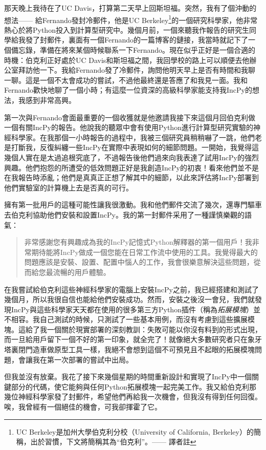 \documentclass[12pt,UTF8,nofonts]{book}
\begin{document}
那天晚上我待在了UC Davis，打算第二天早上回斯坦福。突然，我有了個沖動的想法—— 給Fernando發封冷郵件，他是UC Berkeley\footnote{UC Berkeley是加州大學伯克利分校（University of California, Berkeley）的簡稱，出於習慣，下文將簡稱其為“伯克利”。—— 譯者註}的一個研究科學家，他非常熱心於將Python投入到計算型研究中。幾個月前，一個來聽我作報告的研究生同學給我發了封郵件，裏面有一個Fernando的一篇博客的鏈接，我當時就記下了一個備忘錄，準備在將來某個時候聯系一下Fernando。現在似乎正好是一個合適的時機：伯克利正好處於UC Davis和斯坦福之間，我回學校的路上可以順便去他辦公室拜訪他一下。我給Fernando發了冷郵件，詢問他明天早上是否有時間和我聊一聊。這是一個不太會成功的嘗試，不過他最終還是答應了和我見一面。我和Fernando歡快地聊了一個小時；有這麼一位資深的高級科學家能支持我IncPy的想法，我感到非常高興。

第一次與Fernando會面最重要的一個收獲就是他邀請我接下來這個月回伯克利做一個有關IncPy的報告。他說我的聽眾中會有使用Python進行計算型研究實驗的神經科學家。在我那個一小時報告的過程中，我被三個研究員稍稍嚇了一跳，他們老是打斷我，反復糾纏一些IncPy在實際中表現如何的細節問題。一開始，我覺得這幾個人實在是太過追根究底了，不過報告後他們過來向我表達了試用IncPy的強烈興趣。他們抱怨的所遭受的低效問題正好是我創造IncPy的初衷！看來他們並不是在我報告時添亂；他們是真真正正想了解其中的細節，以此來評估將IncPy部署到他們實驗室的計算機上去是否真的可行。

擁有第一批用戶的這種可能性讓我很激動。我和他們郵件交流了幾次，還專門驅車去伯克利協助他們安裝和設置IncPy。我的第一封郵件采用了一種謹慎樂觀的語氣：
\begin{quote}
  非常感謝您有興趣成為我的IncPy記憶式Python解釋器的第一個用戶！我非常期待能將IncPy做成一個您能在日常工作流中使用的工具。我覺得最大的問題應該是安裝、設置、配置中惱人的工作，我會很樂意解決這些問題，從而給您最流暢的用戶體驗。
\end{quote}

在我嘗試給伯克利這些神經科學家的電腦上安裝IncPy之前，我已經搭建和測試了幾個月，所以我很自信也能給他們安裝成功。然而，安裝之後沒一會兒，我們就發現IncPy與這些科學家天天都在使用的很多第三方Python插件（稱為\emph{拓展模塊}）並不相容。我自己測試的時候，只測試了一些基本用例，而沒有考慮到這些擴展模塊。這給了我一個關於現實部署的深刻教訓：失敗可能以你沒有料到的形式出現，而一旦給用戶留下一個不好的第一印象，就全完了！就像絕大多數研究者只在象牙塔裏閉門造車做原型工具一樣，我絕不會想到這個不可預見且不起眼的拓展模塊問題，會讓我在第一次部署的嘗試中出局。

但我並沒有放棄。我花了接下來幾個星期的時間重新設計和實現了IncPy中一個關鍵部分的代碼，使它能夠與任何Python拓展模塊一起完美工作。我又給伯克利那幾位神經科學家發了封郵件，希望他們再給我一次機會，但我沒有得到任何回復。唉，我曾經有一個絕佳的機會，可我卻揮霍了它。
\end{document}
